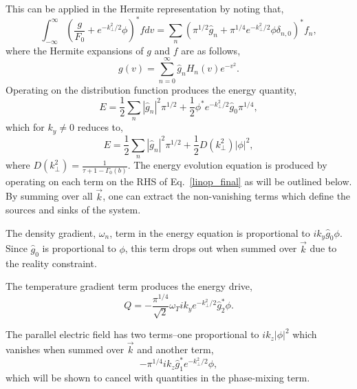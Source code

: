 This can be applied in the Hermite representation by noting that,
\begin{equation}
\int^\infty_{-\infty} \left ( \frac{g}{F_0} + e^{-k^2_\perp/2}\phi \right )^* f dv= \sum_n \left ( \pi^{1/2} \hat{g}_n+\pi^{1/4} e^{-k^2_\perp/2}\phi \delta_{n,0} \right )^* f_n, 
\end{equation}
where the Hermite expansions of $g$ and $f$ are as follows, 
\begin{equation}
g(v)=\sum^\infty_{n=0} \hat{g}_n H_n(v)e^{-v^2}.
\end{equation}
Operating on the distribution function produces the energy quantity,
\begin{equation}
E= \frac{1}{2}\sum_n \left | \hat{g}_n \right |^2 \pi^{1/2} +  \frac{1}{2}\phi^* e^{-k^2_\perp/2}\hat{g}_0 \pi^{1/4},
\end{equation}
which for $k_y\neq 0$ reduces to,
\begin{equation}
E= \frac{1}{2}\sum_n \left | \hat{g}_n \right |^2 \pi^{1/2} +  \frac{1}{2}D(k_{\perp}^2) \left | \phi \right |^2,
\end{equation}
where $D(k_{\perp}^2)=\frac{1}{\tau+1-\Gamma_0(b)}$.
The energy evolution equation is produced by operating on each term on the RHS of Eq.~\ref{linop_final} as will be outlined below.  By summing over all $\vec{k}$, one can extract the non-vanishing terms which define the sources and sinks of the system.

The density gradient, $\omega_n$, term in the energy equation is proportional to $i k_y \hat{g}_0 \phi$.  Since $\hat{g}_0$ is proportional to $\phi$, this term drops out when summed over $\vec{k}$ due to the reality constraint.  %

The temperature gradient term produces the energy drive,
\begin{equation}
Q=-\frac{\pi^{1/4}}{\sqrt{2}} \omega_T i k_y e^{-k^2_\perp/2}\hat{g}^*_2 \phi.
\end{equation}

The parallel electric field has two terms--one proportional to $i k_z | \phi |^2$ which vanishes when summed over $\vec{k}$ and another term,
\begin{equation}
-\pi^{1/4} i k_z \hat{g}^*_1 e^{-k^2_\perp/2}\phi,
\label{cancel_E||}
\end{equation}
which will be shown to cancel with quantities in the phase-mixing term.

